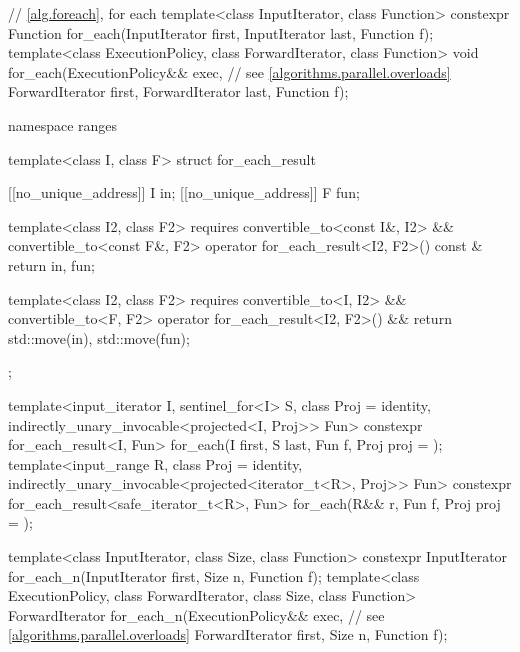 \begin{codeblock}
{  // \ref{alg.foreach}, for each
  template<class InputIterator, class Function>
    constexpr Function for_each(InputIterator first, InputIterator last, Function f);
  template<class ExecutionPolicy, class ForwardIterator, class Function>
    void for_each(ExecutionPolicy&& exec,                       // see \ref{algorithms.parallel.overloads}
                  ForwardIterator first, ForwardIterator last, Function f);

  namespace ranges {
    template<class I, class F>
    struct for_each_result {
      [[no_unique_address]] I in;
      [[no_unique_address]] F fun;

      template<class I2, class F2>
        requires convertible_to<const I&, I2> && convertible_to<const F&, F2>
        operator for_each_result<I2, F2>() const & {
          return {in, fun};
        }

      template<class I2, class F2>
        requires convertible_to<I, I2> && convertible_to<F, F2>
        operator for_each_result<I2, F2>() && {
          return {std::move(in), std::move(fun)};
        }
    };

    template<input_iterator I, sentinel_for<I> S, class Proj = identity,
             indirectly_unary_invocable<projected<I, Proj>> Fun>
      constexpr for_each_result<I, Fun>
        for_each(I first, S last, Fun f, Proj proj = {});
    template<input_range R, class Proj = identity,
             indirectly_unary_invocable<projected<iterator_t<R>, Proj>> Fun>
      constexpr for_each_result<safe_iterator_t<R>, Fun>
        for_each(R&& r, Fun f, Proj proj = {});
  }

  template<class InputIterator, class Size, class Function>
    constexpr InputIterator for_each_n(InputIterator first, Size n, Function f);
  template<class ExecutionPolicy, class ForwardIterator, class Size, class Function>
    ForwardIterator for_each_n(ExecutionPolicy&& exec,          // see \ref{algorithms.parallel.overloads}
                               ForwardIterator first, Size n, Function f);

}
\end{codeblock}
